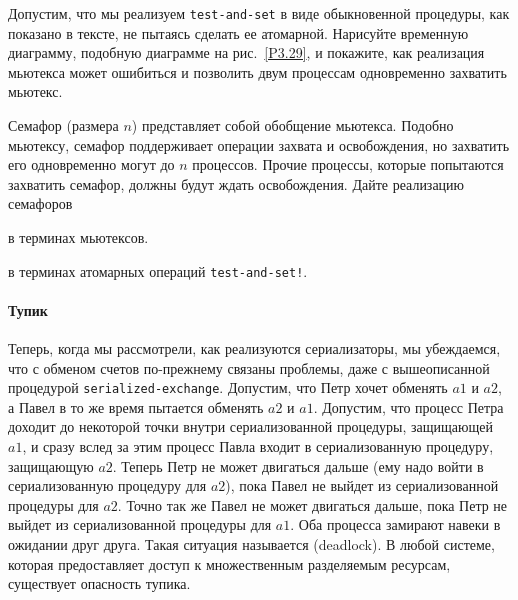 \begin{exercise}{3.46}\label{EX3.46}%
Допустим, что мы реализуем {\tt test-and-set} в
виде обыкновенной процедуры, как показано в тексте, не пытаясь сделать
ее атомарной.  Нарисуйте временную диаграмму, подобную диаграмме на
рис.~\ref{P3.29}, и покажите, как реализация мьютекса может
ошибиться и позволить двум процессам одновременно захватить мьютекс.
\end{exercise}
\begin{exercise}{3.47}\label{EX3.47}%
 Семафор (размера $n$) представляет собой
обобщение мьютекса.  Подобно мьютексу, семафор поддерживает операции
захвата и освобождения, но захватить его одновременно могут до
$n$ процессов.  Прочие процессы, которые попытаются
захватить семафор, должны будут ждать освобождения.  Дайте реализацию
семафоров
\begin{plainenum}


\item
в терминах мьютексов.

\item
в терминах атомарных операций {\tt test-and-set!}.
\end{plainenum}
\end{exercise}

\paragraph{Тупик}


Теперь, когда
мы рассмотрели, как реализуются
сериализаторы, мы убеждаемся, что с обменом счетов по-прежнему
связаны проблемы, даже с вышеописанной процедурой
{\tt serialized-exchange}.  Допустим, что Петр хочет обменять
$a1$ и $a2$, а Павел в то же время пытается
обменять $a2$ и $a1$.  Допустим, что процесс
Петра доходит до некоторой точки внутри сериализованной процедуры,
защищающей $a1$, и сразу вслед за этим процесс Павла входит
в сериализованную процедуру, защищающую $a2$.  Теперь Петр
не может двигаться дальше (ему надо войти в сериализованную процедуру
для $a2$), пока Павел не выйдет из сериализованной
процедуры для $a2$.  Точно так же Павел не может двигаться
дальше, пока Петр не выйдет из сериализованной процедуры для
$a1$.  Оба процесса замирают навеки в ожидании друг
друга.  Такая ситуация называется  (deadlock).  В
любой системе, которая предоставляет доступ к множественным
разделяемым ресурсам, существует опасность тупика.




